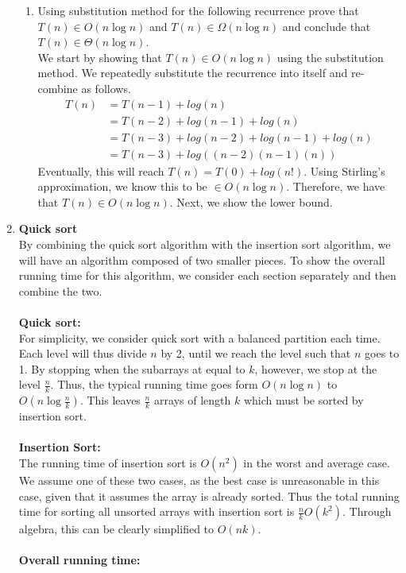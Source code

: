 \documentclass{article}
\begin{document}
\begin{enumerate}
\begin{enumerate}
	\item Using substitution method for the following recurrence prove that $T(n)\in O(n \log n)$ and $T(n) \in \Omega(n \log n)$ and conclude that $T(n)\in \Theta(n \log n)$.
	\\ We start by showing that $T(n)\in O(n \log n)$ using the substitution method. We repeatedly substitute the recurrence into itself and re-combine as follows.
	\begin{align}
	T(n) &= T(n-1) + log(n) \\
	&= T(n-2) + log(n-1)+log(n)\\
	&= T(n-3) + log(n-2)+log(n-1)+log(n) \\
	&= T(n-3) + log((n-2)(n-1)(n)) 
	\end{align}
	Eventually, this will reach $T(n) = T(0)+log(n!)$. Using Stirling's approximation, we know this to be $\in O(n \log n)$. Therefore, we have that $T(n) \in O(n \log n)$. Next, we show the lower bound.
	\end{enumerate}
\item \textbf{Quick sort}
	\\ By combining the quick sort algorithm with the insertion sort algorithm, we will have an algorithm composed of two smaller pieces. To show the overall running time for this algorithm, we consider each section separately and then combine the two.
	\\ \\ \textbf{Quick sort:}
	\\ For simplicity, we consider quick sort with a balanced partition each time. Each level will thus divide $n$ by 2, until we reach the level such that $n$ goes to 1. By stopping when the subarrays at equal to $k$, however, we stop at the level $\frac{n}{k}$. Thus, the typical running time goes form $O(n\log n)$ to $O(n\log \frac{n}{k})$. This leaves $\frac{n}{k}$ arrays of length $k$ which must be sorted by insertion sort.
	\\ \\ \textbf{Insertion Sort:}
	\\ The running time of insertion sort is $O(n^2)$ in the worst and average case. We assume one of these two cases, as the best case is unreasonable in this case, given that it assumes the array is already sorted. Thus the total running time for sorting all unsorted arrays with insertion sort is $\frac{n}{k}O(k^2)$. Through algebra, this can be clearly simplified to $O(nk)$.
	\\ \\ \textbf{Overall running time:}

\end{enumerate}
\end{document}
